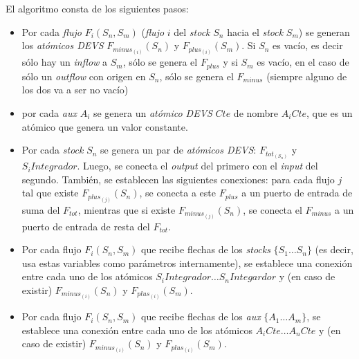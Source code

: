 El algoritmo consta de los siguientes pasos:
\begin{itemize}
	\item Por cada \textit{flujo} $F_{i}(S_n,S_m)$ (\textit{flujo} $i$ del \textit{stock} $S_n$ hacia el \textit{stock} $S_m$) se generan los \textit{atómicos DEVS} $F_{minus_{(i)}}(S_n)$ y $F_{plus_{(i)}}(S_m)$. Si $S_n$ es vacío, es decir sólo hay un \textit{inflow} a $S_m$, sólo se genera el $F_{plus}$ y si $S_m$ es vacío, en el caso de sólo un \textit{outflow} con origen en $S_n$, sólo se genera el $F_{minus}$ (siempre alguno de los dos va a ser no vacío)

	\item por cada \textit{aux} $A_i$ se genera un \textit{atómico DEVS} $Cte$ de nombre $A_{i}Cte$, que es un atómico que genera un valor constante.

	\item Por cada \textit{stock} $S_n$ se genera un par de \textit{atómicos DEVS}: $F_{tot_{(S_n)}}$ y $S_{i}Integrador$. Luego, se conecta el \textit{output} del primero con el \textit{input} del segundo. También, se establecen las siguientes conexiones: para cada flujo $j$ tal que existe $F_{plus_{(j)}}(S_n)$, se conecta a este $F_{plus}$ a un puerto de entrada de suma del $F_{tot}$, mientras que si existe $F_{minus_{(j)}}(S_n)$, se conecta el $F_{minus}$ a un puerto de entrada de resta del $F_{tot}$.
	
	\item Por cada flujo $F_{i}(S_n,S_m)$ que recibe flechas de los \textit{stocks} $\{ S_1 \dots S_n \}$ (es decir, usa estas variables como parámetros internamente), se establece una conexión entre cada uno de los atómicos $S_{i}Integrador \dots S_{n}Integardor$ y (en caso de existir) $F_{minus_{(i)}}(S_n)$ y $F_{plus_{(i)}}(S_m)$.

	\item Por cada flujo $F_{i}(S_n,S_m)$ que recibe flechas de los \textit{aux} $\{ A_1 \dots A_m \}$, se establece una conexión entre cada uno de los atómicos $A_{i}Cte \dots A_{n}Cte$ y (en caso de existir) $F_{minus_{(i)}}(S_n)$ y $F_{plus_{(i)}}(S_m)$.

\end{itemize}
